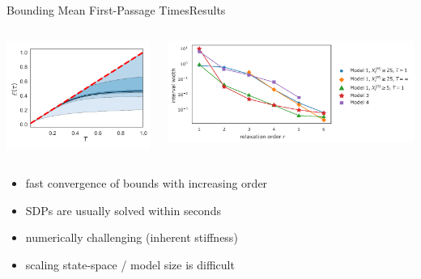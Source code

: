 \documentclass[10pt]{beamer}
\newcommand{\bottomcite}[1]{\vspace*{\fill} {\scriptsize \parencite{#1}}}
\begin{document}
\begin{frame}{Bounding Mean First-Passage Times}{Results}
    \begin{columns}
        \begin{column}{.33\paperwidth}
            \includegraphics[width=\textwidth]{../gfx/mfpt_bounds.pdf}
        \end{column}
        \begin{column}{.57\paperwidth}
            \includegraphics[width=\textwidth]{../gfx/convergence.pdf}
        \end{column}
    \end{columns}
    \vspace{2em}
    \begin{itemize}
        \item fast convergence of bounds with increasing order
        \item SDPs are usually solved within seconds
        \item numerically challenging (inherent stiffness)
        \item scaling state-space / model size is difficult
    \end{itemize}
\bottomcite{backenkohler2019bounding}
\end{frame}
\end{document}
